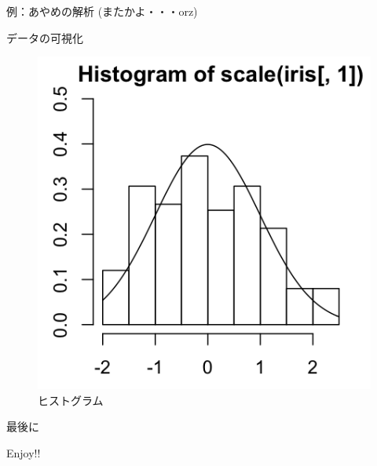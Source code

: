 \begin{frame}[fragile]{例：あやめの解析 (またかよ・・・orz)}
\begin{block}{データの可視化}
\begin{figure}[htbp]
\centering
\includegraphics{figure/md-docx-fig1.png}
\caption{ヒストグラム}
\end{figure}

\end{block}

\end{frame}

\begin{frame}{最後に}

Enjoy!!

\end{frame}

